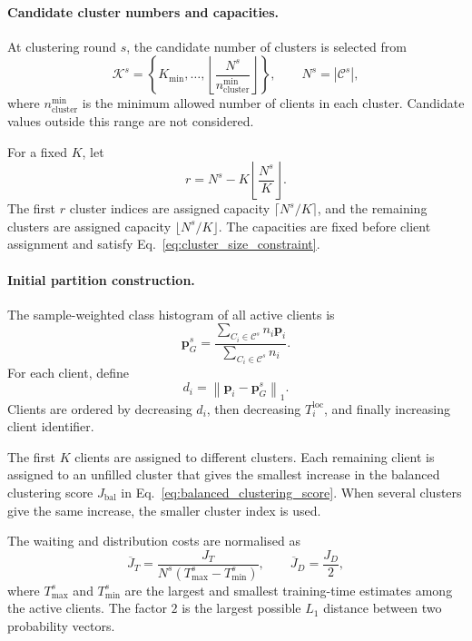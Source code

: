 \documentclass[pdflatex,sn-mathphys-num]{sn-jnl}
\begin{document}
\paragraph{Candidate cluster numbers and capacities.}

At clustering round \(s\), the candidate number of clusters is selected from
\begin{equation}
\mathcal{K}^s
=
\left\{
K_{\min},
\ldots,
\left\lfloor
\frac{N^s}
{n_{\mathrm{cluster}}^{\min}}
\right\rfloor
\right\},
\qquad
N^s
=
|\mathcal{C}^s|,
\label{eq:supp_candidate_cluster_numbers}
\end{equation}
where \(n_{\mathrm{cluster}}^{\min}\) is the minimum allowed number of clients in each cluster. Candidate values outside this range are not considered.

For a fixed \(K\), let
\[
r
=
N^s
-
K
\left\lfloor
\frac{N^s}{K}
\right\rfloor .
\]
The first \(r\) cluster indices are assigned capacity
\(\lceil N^s/K\rceil\), and the remaining clusters are assigned capacity
\(\lfloor N^s/K\rfloor\). The capacities are fixed before client assignment and satisfy Eq.~\eqref{eq:cluster_size_constraint}.

\paragraph{Initial partition construction.}
The sample-weighted class histogram of all active clients is
\begin{equation}
\mathbf{p}_G^s
=
\frac{
\sum_{C_i\in \mathcal{C}^s} n_i\mathbf{p}_i
}{
\sum_{C_i\in \mathcal{C}^s} n_i
}.
\end{equation}
For each client, define
\begin{equation}
d_i
=
\left\|
\mathbf{p}_i
-
\mathbf{p}_G^s
\right\|_1 .
\label{eq:supp_client_histogram_distance}
\end{equation}
Clients are ordered by decreasing \(d_i\), then decreasing \(T_i^{\mathrm{loc}}\), and finally increasing client identifier.

The first \(K\) clients are assigned to different clusters. Each remaining client is assigned to an unfilled cluster that gives the smallest increase in the balanced clustering score \(J_{\mathrm{bal}}\) in Eq.~\eqref{eq:balanced_clustering_score}. When several clusters give the same increase, the smaller cluster index is used.

The waiting and distribution costs are normalised as
\begin{equation}
\overline{J}_T
=
\frac{
J_T
}{
N^s
\left(
T_{\max}^s
-
T_{\min}^s
\right)
},
\qquad
\overline{J}_D
=
\frac{J_D}{2},
\label{eq:supp_score_normalisation}
\end{equation}
where \(T_{\max}^s\) and \(T_{\min}^s\) are the largest and smallest training-time estimates among the active clients. The factor \(2\) is the largest possible \(L_1\) distance between two probability vectors.
\end{document}
